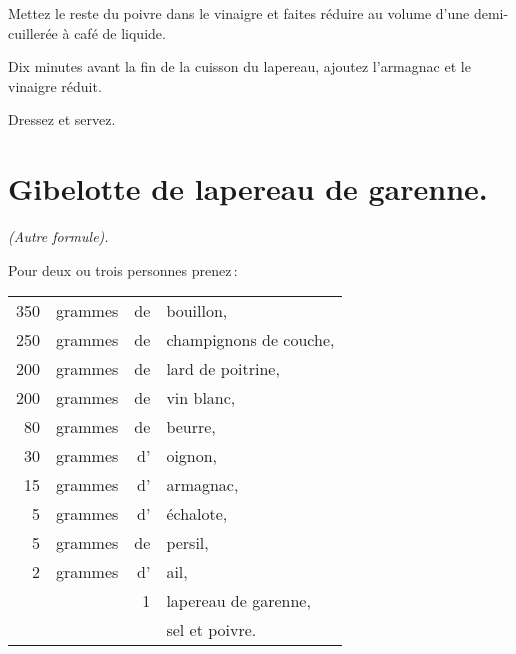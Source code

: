 Mettez le reste du poivre dans le vinaigre et faites réduire au volume d'une
demi-cuillerée à café de liquide.

Dix minutes avant la fin de la cuisson du lapereau, ajoutez l'armagnac et le
vinaigre réduit.

Dressez et servez.

\section*{\centering Gibelotte de lapereau de garenne.}
{}

\begin{center}
\textit{(Autre formule).}
\end{center}

Pour deux ou trois personnes prenez :

\footnotesize
\begin{longtable}{rrrp{16em}}
    350 & grammes & de & bouillon,                                                                        \\
    250 & grammes & de & champignons de couche,                                                           \\
    200 & grammes & de & lard de poitrine,                                                                \\
    200 & grammes & de & vin blanc,                                                                       \\
     80 & grammes & de & beurre,                                                                          \\
     30 & grammes & d' & oignon,                                                                          \\
     15 & grammes & d' & armagnac,                                                                        \\
      5 & grammes & d' & échalote,                                                                        \\
      5 & grammes & de & persil,                                                                          \\
      2 & grammes & d' & ail,                                                                             \\
        &         &  1 & lapereau de garenne,                                                             \\
        &         &    & sel et poivre.                                                                   \\
\end{longtable}
\normalsize


